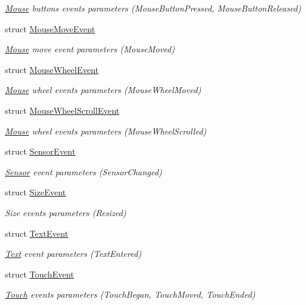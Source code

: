 \begin{DoxyCompactItemize}
\begin{DoxyCompactList}\small\item\em \mbox{\hyperlink{classsf_1_1_mouse}{Mouse}} buttons events parameters (Mouse\+Button\+Pressed, Mouse\+Button\+Released) \end{DoxyCompactList}\item 
struct \mbox{\hyperlink{structsf_1_1_event_1_1_mouse_move_event}{Mouse\+Move\+Event}}
\begin{DoxyCompactList}\small\item\em \mbox{\hyperlink{classsf_1_1_mouse}{Mouse}} move event parameters (Mouse\+Moved) \end{DoxyCompactList}\item 
struct \mbox{\hyperlink{structsf_1_1_event_1_1_mouse_wheel_event}{Mouse\+Wheel\+Event}}
\begin{DoxyCompactList}\small\item\em \mbox{\hyperlink{classsf_1_1_mouse}{Mouse}} wheel events parameters (Mouse\+Wheel\+Moved) \end{DoxyCompactList}\item 
struct \mbox{\hyperlink{structsf_1_1_event_1_1_mouse_wheel_scroll_event}{Mouse\+Wheel\+Scroll\+Event}}
\begin{DoxyCompactList}\small\item\em \mbox{\hyperlink{classsf_1_1_mouse}{Mouse}} wheel events parameters (Mouse\+Wheel\+Scrolled) \end{DoxyCompactList}\item 
struct \mbox{\hyperlink{structsf_1_1_event_1_1_sensor_event}{Sensor\+Event}}
\begin{DoxyCompactList}\small\item\em \mbox{\hyperlink{classsf_1_1_sensor}{Sensor}} event parameters (Sensor\+Changed) \end{DoxyCompactList}\item 
struct \mbox{\hyperlink{structsf_1_1_event_1_1_size_event}{Size\+Event}}
\begin{DoxyCompactList}\small\item\em Size events parameters (Resized) \end{DoxyCompactList}\item 
struct \mbox{\hyperlink{structsf_1_1_event_1_1_text_event}{Text\+Event}}
\begin{DoxyCompactList}\small\item\em \mbox{\hyperlink{classsf_1_1_text}{Text}} event parameters (Text\+Entered) \end{DoxyCompactList}\item 
struct \mbox{\hyperlink{structsf_1_1_event_1_1_touch_event}{Touch\+Event}}
\begin{DoxyCompactList}\small\item\em \mbox{\hyperlink{classsf_1_1_touch}{Touch}} events parameters (Touch\+Began, Touch\+Moved, Touch\+Ended) \end{DoxyCompactList}\end{DoxyCompactItemize}

